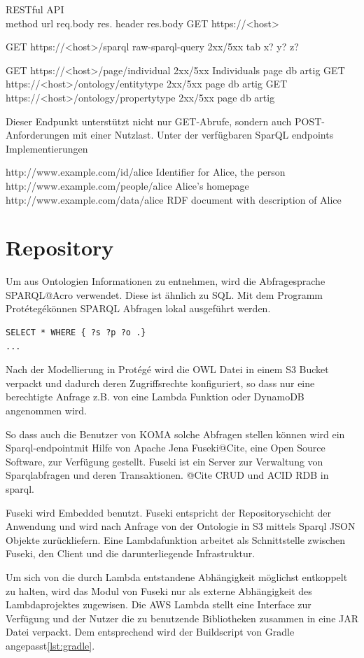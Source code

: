 \documentclass[
12pt,
english,
ngerman,
headsepline,
twoside,
openright,
numbers=noenddot,version=first
]{scrreprt}
\begin{document}
RESTful API \\
method url req.body res. header res.body
GET https://<host>

GET https://<host>/sparql raw-sparql-query 2xx/5xx tab x? y? z?

GET https://<host>/page/individual 2xx/5xx Individuals page db artig\cite{Hunter2017}
GET https://<host>/ontology/entitytype 2xx/5xx page db artig
GET https://<host>/ontology/propertytype 2xx/5xx page db artig

Dieser Endpunkt unterstützt nicht nur GET-Abrufe, sondern auch POST-Anforderungen mit einer Nutzlast.
Unter der verfügbaren SparQL endpoints Implementierungen


http://www.example.com/id/alice
Identifier for Alice, the person
http://www.example.com/people/alice
Alice's homepage
http://www.example.com/data/alice
RDF document with description of Alice

\section{Repository}

Um aus Ontologien Informationen zu entnehmen, wird die Abfragesprache \glqq SPARQL\grqq @Acro verwendet. 
Diese ist ähnlich zu SQL. Mit dem Programm \glqq Protétegé\grqq können SPARQL Abfragen lokal ausgeführt werden.

\begin{lstlisting}[language=Sparql]
SELECT * WHERE { ?s ?p ?o .}
...
\end{lstlisting}

Nach der Modellierung in Protégé wird die OWL Datei in einem S3 Bucket verpackt und dadurch deren Zugriffsrechte konfiguriert, so dass nur eine berechtigte Anfrage z.B. von eine Lambda Funktion oder DynamoDB angenommen wird.

So dass auch die Benutzer von KOMA solche Abfragen stellen können wird ein \glqq Sparql-endpoint\grqq mit Hilfe von Apache Jena Fuseki@Cite, eine Open Source Software, zur Verfügung gestellt. Fuseki ist ein Server zur Verwaltung von Sparqlabfragen und deren Transaktionen. @Cite CRUD und ACID RDB in sparql.


Fuseki wird Embedded benutzt.
Fuseki entspricht der Repositoryschicht der Anwendung und wird nach Anfrage von der Ontologie in S3 mittels Sparql JSON Objekte zurückliefern.
Eine Lambdafunktion arbeitet als Schnittstelle zwischen Fuseki, den Client und die darunterliegende Infrastruktur.

Um sich von die durch Lambda entstandene Abhängigkeit möglichst entkoppelt\cite{FlowerRefactoring} zu halten, wird das Modul von Fuseki nur als externe Abhängigkeit des Lambdaprojektes zugewisen.
Die AWS Lambda stellt eine Interface zur Verfügung und der Nutzer die zu benutzende Bibliotheken zusammen in eine JAR Datei verpackt. Dem entsprechend wird der Buildscript von Gradle\cite{Muschko2014} angepasst\ref{lst:gradle}. 
\end{document}
